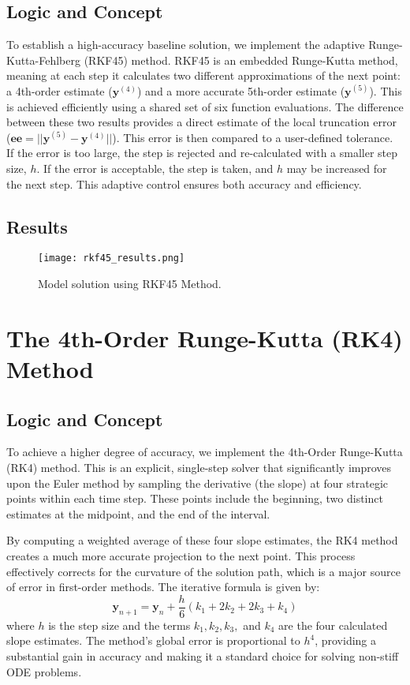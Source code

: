 \documentclass[conference]{IEEEtran}
\begin{document}
\subsection{Logic and Concept}
To establish a high-accuracy baseline solution, we implement the adaptive Runge-Kutta-Fehlberg (RKF45) method. RKF45 is an embedded Runge-Kutta method, meaning at each step it calculates two different approximations of the next point: a 4th-order estimate ($\mathbf{y}^{(4)}$) and a more accurate 5th-order estimate ($\mathbf{y}^{(5)}$). This is achieved efficiently using a shared set of six function evaluations. The difference between these two results provides a direct estimate of the local truncation error ($\mathbf{ee} = ||\mathbf{y}^{(5)} - \mathbf{y}^{(4)}||$). This error is then compared to a user-defined tolerance. If the error is too large, the step is rejected and re-calculated with a smaller step size, $h$. If the error is acceptable, the step is taken, and $h$ may be increased for the next step. This adaptive control ensures both accuracy and efficiency.

\subsection{Results}
\begin{figure}[htp]
\centerline{\texttt{[image: rkf45\_results.png]}}
\caption{Model solution using RKF45 Method.}
\label{fig:rkf45}
\end{figure}

\section{The 4th-Order Runge-Kutta (RK4) Method}
\subsection{Logic and Concept}
To achieve a higher degree of accuracy, we implement the 4th-Order Runge-Kutta (RK4) method. This is an explicit, single-step solver that significantly improves upon the Euler method by sampling the derivative (the slope) at four strategic points within each time step. These points include the beginning, two distinct estimates at the midpoint, and the end of the interval.

By computing a weighted average of these four slope estimates, the RK4 method creates a much more accurate projection to the next point. This process effectively corrects for the curvature of the solution path, which is a major source of error in first-order methods. The iterative formula is given by:
\begin{equation}
    \mathbf{y}_{n+1} = \mathbf{y}_n + \frac{h}{6}(k_1 + 2k_2 + 2k_3 + k_4)
\end{equation}
where $h$ is the step size and the terms $k_1, k_2, k_3,$ and $k_4$ are the four calculated slope estimates. The method's global error is proportional to $h^4$, providing a substantial gain in accuracy and making it a standard choice for solving non-stiff ODE problems.
\end{document}
